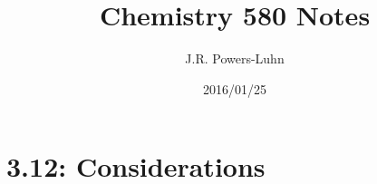 \documentclass{article}
\author{J.R. Powers-Luhn}
\date{2016/01/25}
\title{Chemistry 580 Notes}
\begin{document}
\section{3.12: Considerations}
\end{document}
